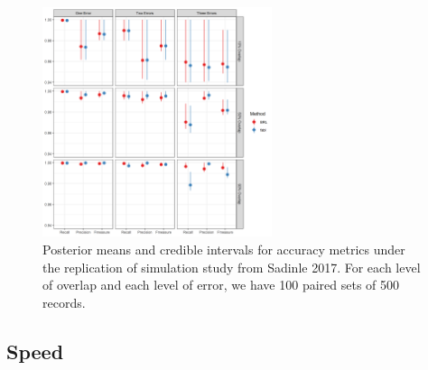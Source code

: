 \documentclass[12pt,letterpaper]{article}
\newcommand{\1}[1]{\mathbb{I}\!\left[#1\right]} %
\begin{document}
%	


\begin{figure}[htbp]
\begin{center}
\includegraphics[width=0.6\textwidth]{../notes/figures/sadinle_sim_plot} 
\caption{Posterior means and credible intervals for accuracy metrics under the replication of simulation study from Sadinle 2017. For each level of overlap and each level of error, we have 100 paired sets of 500 records.}
\label{fig:sadinle_simulation}
\end{center}
\end{figure}

%
%	
%		
%	
%	

\hypertarget{speed}{%
	\subsection{Speed}\label{speed}}
\end{document}
